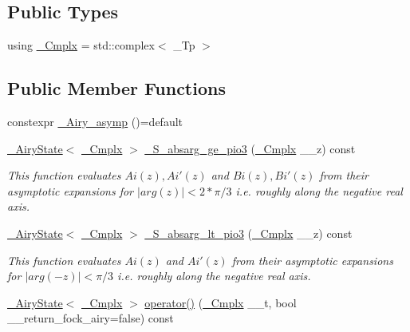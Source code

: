 \subsection*{Public Types}
\begin{DoxyCompactItemize}
\item 
using \hyperlink{classstd_1_1____detail_1_1__Airy__asymp_ae28f102423d34e78502ab6da42d67f50}{\+\_\+\+Cmplx} = std\+::complex$<$ \+\_\+\+Tp $>$
\end{DoxyCompactItemize}
\subsection*{Public Member Functions}
\begin{DoxyCompactItemize}
\item 
constexpr \hyperlink{classstd_1_1____detail_1_1__Airy__asymp_a93f2010a2c48be2f38445420ba019a52}{\+\_\+\+Airy\+\_\+asymp} ()=default
\item 
\hyperlink{structstd_1_1____detail_1_1__AiryState}{\+\_\+\+Airy\+State}$<$ \hyperlink{classstd_1_1____detail_1_1__Airy__asymp_ae28f102423d34e78502ab6da42d67f50}{\+\_\+\+Cmplx} $>$ \hyperlink{classstd_1_1____detail_1_1__Airy__asymp_a07ae28d3c6adb259396542ac99741f4f}{\+\_\+\+S\+\_\+absarg\+\_\+ge\+\_\+pio3} (\hyperlink{classstd_1_1____detail_1_1__Airy__asymp_ae28f102423d34e78502ab6da42d67f50}{\+\_\+\+Cmplx} \+\_\+\+\_\+z) const 
\begin{DoxyCompactList}\small\item\em This function evaluates $ Ai(z), Ai'(z) $ and $ Bi(z), Bi'(z) $ from their asymptotic expansions for $ |arg(z)| < 2*\pi/3 $ i.\+e. roughly along the negative real axis. \end{DoxyCompactList}\item 
\hyperlink{structstd_1_1____detail_1_1__AiryState}{\+\_\+\+Airy\+State}$<$ \hyperlink{classstd_1_1____detail_1_1__Airy__asymp_ae28f102423d34e78502ab6da42d67f50}{\+\_\+\+Cmplx} $>$ \hyperlink{classstd_1_1____detail_1_1__Airy__asymp_ac64506848c5b2cfd0d90d30bdac33416}{\+\_\+\+S\+\_\+absarg\+\_\+lt\+\_\+pio3} (\hyperlink{classstd_1_1____detail_1_1__Airy__asymp_ae28f102423d34e78502ab6da42d67f50}{\+\_\+\+Cmplx} \+\_\+\+\_\+z) const 
\begin{DoxyCompactList}\small\item\em This function evaluates $ Ai(z) $ and $ Ai'(z) $ from their asymptotic expansions for $ |arg(-z)| < \pi/3 $ i.\+e. roughly along the negative real axis. \end{DoxyCompactList}\item 
\hyperlink{structstd_1_1____detail_1_1__AiryState}{\+\_\+\+Airy\+State}$<$ \hyperlink{classstd_1_1____detail_1_1__Airy__asymp_ae28f102423d34e78502ab6da42d67f50}{\+\_\+\+Cmplx} $>$ \hyperlink{classstd_1_1____detail_1_1__Airy__asymp_ab14d7f3146c40aa7d6fd581ff71644c7}{operator()} (\hyperlink{classstd_1_1____detail_1_1__Airy__asymp_ae28f102423d34e78502ab6da42d67f50}{\+\_\+\+Cmplx} \+\_\+\+\_\+t, bool \+\_\+\+\_\+return\+\_\+fock\+\_\+airy=false) const 
\end{DoxyCompactItemize}


